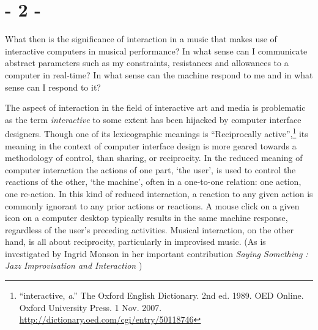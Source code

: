 \documentclass{article}
\begin{document}



\section*{- 2 -}
\label{sec:-2-}


What then is the significance of interaction in a music that makes use of interactive computers in musical performance? In what sense can I communicate abstract parameters such as my constraints, resistances and allowances to a computer in real-time? In what sense can the machine respond to me and in what sense can I respond to it?

The aspect of interaction in the field of interactive art and media is problematic as the term \emph{interactive} to some extent has been hijacked by computer interface designers. Though one of its lexicographic meanings is ``Reciprocally active'',\footnote{``interactive, \textit{a}.'' The Oxford English Dictionary. 2nd ed. 1989. OED Online. Oxford University Press. 1 Nov. 2007. \url{http://dictionary.oed.com/cgi/entry/50118746}} its meaning in the context of computer interface design is more geared towards a methodology of control, than sharing, or reciprocity. In the reduced meaning of computer interaction the actions of one part, `the user', is used to control the \emph{re}actions of the other, `the machine', often in a one-to-one relation: one action, one re-action. In this kind of reduced interaction, a reaction to any given action is commonly ignorant to any prior actions or reactions. A mouse click on a given icon on a computer desktop typically results in the same machine response, regardless of the user's preceding activities. Musical interaction, on the other hand, is all about reciprocity, particularly in improvised music. (As is investigated by Ingrid Monson in her important contribution \emph{Saying Something : Jazz Improvisation and Interaction} \citep[][]{monson96} )
\end{document}
